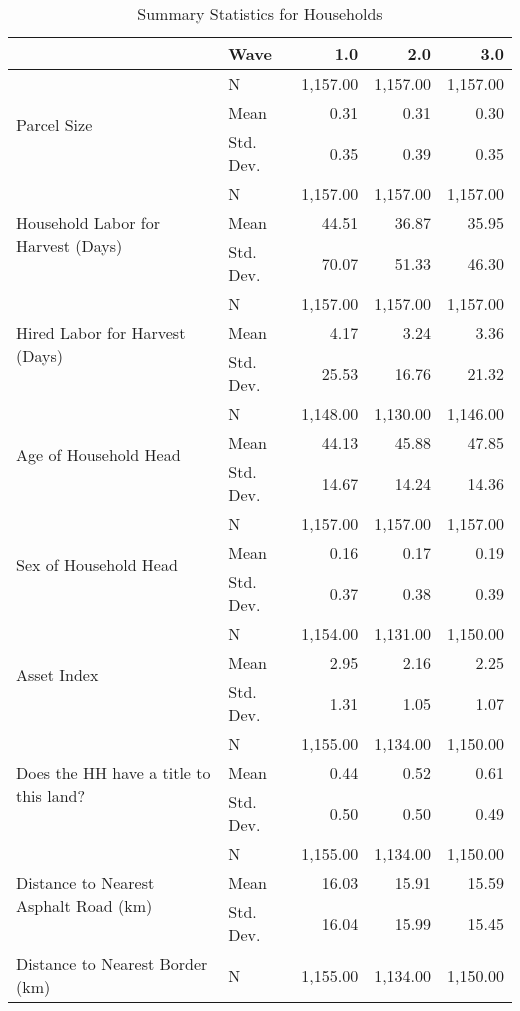 \begin{table}
\caption{Summary Statistics for Households}
\label{tbl:summary}
\begin{tabular}{llrrr}
\toprule
{} & {Wave} & {1.0} & {2.0} & {3.0} \\
\midrule
\multirow[c]{3}{*}{Parcel Size} & N & 1,157.00 & 1,157.00 & 1,157.00 \\
 & Mean & 0.31 & 0.31 & 0.30 \\
 & Std. Dev. & 0.35 & 0.39 & 0.35 \\
\multirow[c]{3}{*}{Household Labor for Harvest (Days)} & N & 1,157.00 & 1,157.00 & 1,157.00 \\
 & Mean & 44.51 & 36.87 & 35.95 \\
 & Std. Dev. & 70.07 & 51.33 & 46.30 \\
\multirow[c]{3}{*}{Hired Labor for Harvest (Days)} & N & 1,157.00 & 1,157.00 & 1,157.00 \\
 & Mean & 4.17 & 3.24 & 3.36 \\
 & Std. Dev. & 25.53 & 16.76 & 21.32 \\
\multirow[c]{3}{*}{Age of Household Head} & N & 1,148.00 & 1,130.00 & 1,146.00 \\
 & Mean & 44.13 & 45.88 & 47.85 \\
 & Std. Dev. & 14.67 & 14.24 & 14.36 \\
\multirow[c]{3}{*}{Sex of Household Head} & N & 1,157.00 & 1,157.00 & 1,157.00 \\
 & Mean & 0.16 & 0.17 & 0.19 \\
 & Std. Dev. & 0.37 & 0.38 & 0.39 \\
\multirow[c]{3}{*}{Asset Index} & N & 1,154.00 & 1,131.00 & 1,150.00 \\
 & Mean & 2.95 & 2.16 & 2.25 \\
 & Std. Dev. & 1.31 & 1.05 & 1.07 \\
\multirow[c]{3}{*}{Does the HH have a title to this land?} & N & 1,155.00 & 1,134.00 & 1,150.00 \\
 & Mean & 0.44 & 0.52 & 0.61 \\
 & Std. Dev. & 0.50 & 0.50 & 0.49 \\
\multirow[c]{3}{*}{Distance to Nearest Asphalt Road (km)} & N & 1,155.00 & 1,134.00 & 1,150.00 \\
 & Mean & 16.03 & 15.91 & 15.59 \\
 & Std. Dev. & 16.04 & 15.99 & 15.45 \\
\multirow[c]{3}{*}{Distance to Nearest Border (km)} & N & 1,155.00 & 1,134.00 & 1,150.00 \\

\end{tabular}
\end{table}
